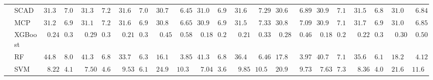 \begin{tabular}{p{0.2cm}p{1cm}|p{0.6cm}p{0.6cm}|p{0.6cm}p{0.6cm}p{0.6cm}p{0.6cm}p{0.6cm}p{0.6cm}|p{0.6cm}p{0.6cm}p{0.6cm}p{0.6cm}p{0.6cm}p{0.6cm}|p{0.6cm}p{0.6cm}p{0.6cm}p{0.6cm}p{0.6cm}p{0.6cm}}
 & SCAD  & $31.35$ & $7.08$ & $31.35$ & $7.23$ & $31.66$ & $7.07$ & $30.71$ & $\phantom{0}6.45$ & $31.06$ & $6.90$ & $31.60$ & $\phantom{0}7.29$ & $30.66$ & $\phantom{0}6.89$ & $30.90$ & $7.18$ & $31.59$ & $6.83$ & $31.05$ & $\phantom{0}6.84$ \\
 & MCP  & $31.25$ & $6.98$ & $31.19$ & $7.29$ & $31.63$ & $6.96$ & $30.86$ & $\phantom{0}6.65$ & $30.94$ & $6.94$ & $31.56$ & $\phantom{0}7.33$ & $30.80$ & $\phantom{0}7.09$ & $30.93$ & $7.12$ & $31.70$ & $6.93$ & $31.05$ & $\phantom{0}6.85$ \\
 & XGBoost  & $\phantom{0}0.24$ & $0.32$ & $\phantom{0}0.29$ & $0.30$ & $\phantom{0}0.21$ & $0.31$ & $\phantom{0}0.45$ & $\phantom{0}0.58$ & $\phantom{0}0.18$ & $0.25$ & $\phantom{0}0.21$ & $\phantom{0}0.33$ & $\phantom{0}0.28$ & $\phantom{0}0.46$ & $\phantom{0}0.18$ & $0.27$ & $\phantom{0}0.22$ & $0.31$ & $\phantom{0}0.30$ & $\phantom{0}0.50$ \\
 & RF  & $44.87$ & $8.00$ & $41.30$ & $6.87$ & $33.76$ & $6.37$ & $16.17$ & $\phantom{0}3.85$ & $41.34$ & $6.80$ & $36.47$ & $\phantom{0}6.46$ & $17.89$ & $\phantom{0}3.97$ & $40.79$ & $7.13$ & $35.60$ & $6.13$ & $18.20$ & $\phantom{0}4.12$ \\
 & SVM  & $\phantom{0}8.22$ & $4.13$ & $\phantom{0}7.50$ & $4.68$ & $\phantom{0}9.53$ & $6.14$ & $24.99$ & $10.31$ & $\phantom{0}7.04$ & $3.64$ & $\phantom{0}9.85$ & $10.59$ & $20.90$ & $\phantom{0}9.73$ & $\phantom{0}7.63$ & $7.31$ & $\phantom{0}8.36$ & $4.04$ & $21.67$ & $11.60$ \\
\hline 
\end{tabular}

